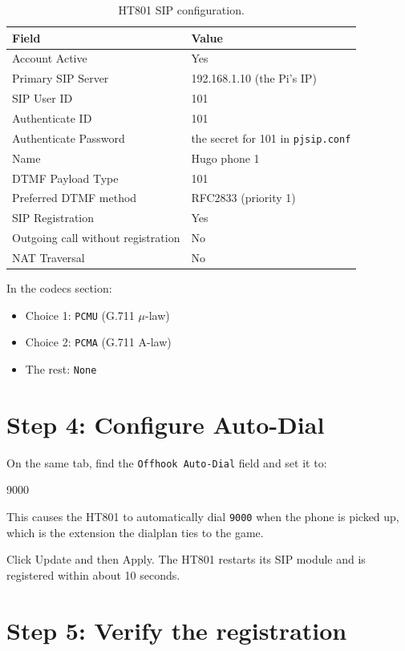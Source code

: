 \begin{table}[h]
\centering
\begin{tabular}{ll}
\toprule
\textbf{Field} & \textbf{Value} \\
\midrule
Account Active & Yes \\
Primary SIP Server & 192.168.1.10 (the Pi's IP) \\
SIP User ID & 101 \\
Authenticate ID & 101 \\
Authenticate Password & the secret for 101 in \texttt{pjsip.conf} \\
Name & Hugo phone 1 \\
DTMF Payload Type & 101 \\
Preferred DTMF method & RFC2833 (priority 1) \\
SIP Registration & Yes \\
Outgoing call without registration & No \\
NAT Traversal & No \\
\bottomrule
\end{tabular}
\caption{HT801 SIP configuration.}
\end{table}

In the codecs section:

\begin{itemize}
  \item Choice 1: \texttt{PCMU} (G.711 $\mu$-law)
  \item Choice 2: \texttt{PCMA} (G.711 A-law)
  \item The rest: \texttt{None}
\end{itemize}

\section{Step 4: Configure Auto-Dial}

On the same tab, find the \texttt{Offhook Auto-Dial} field and set it to:

\begin{plaincode}
9000
\end{plaincode}

This causes the HT801 to automatically dial \texttt{9000} when the phone is picked up, which is the extension the dialplan ties to the game.

Click \textsf{Update} and then \textsf{Apply}. The HT801 restarts its SIP module and is registered within about 10 seconds.

\section{Step 5: Verify the registration}

